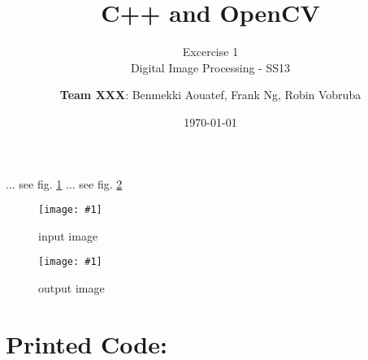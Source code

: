 \documentclass[a4paper,headings=small]{scrartcl}
\title{C++ and OpenCV}
\subtitle{Excercise 1 \\ Digital Image Processing - SS13}
\author{\textbf{Team XXX}: Benmekki Aouatef, Frank Ng, Robin Vobruba}
\date{\today}
\numberwithin{equation}{section} %
\numberwithin{figure}{section}   %
\newcommand{\image}[3]{
	\begin{figure}[htbp]
		\centering
		\texttt{[image: \#1]}
		\caption{#3}
		\label{fig:#1}
	\end{figure}
}
\newcommand{\imgRoot}{../resources/img}
\newcommand{\imgGeneratedRoot}{../../../target}
\begin{document}
\maketitle

... see fig. \ref{fig:\imgRoot/input.jpg}
... see fig. \ref{fig:\imgGeneratedRoot/output.jpg}


\image{\imgRoot/input.jpg}{0.9}{%
		input image}

\image{\imgGeneratedRoot/output.jpg}{0.9}{%
		output image}


\newpage
\section{Printed Code:}


\end{document}
